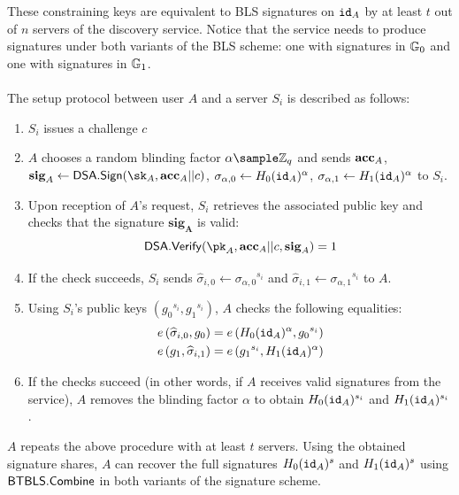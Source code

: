 		\noindent These constraining keys are equivalent to BLS signatures on $\mathtt{id}_A$ by at least $t$ out of $n$ servers of the discovery service. Notice that the service needs to produce signatures under both variants of the BLS scheme: one with signatures in $\mathbb{G}_0$ and one with signatures in $\mathbb{G}_1$.
		
		
		\paragraph{} The setup protocol between user $A$ and a server $S_i$ is described as follows:
		\begin{enumerate}
			\item $S_i$ issues a challenge $c$
			\item $A$ chooses a random blinding factor $\alpha \sample \mathbb{Z}_q$ and sends $\mathbf{acc}_A$, $\mathbf{sig}_A \leftarrow \SIG.\Sign(\sk_A, \acc_A || c)$, $\sigma_{\alpha,0} \leftarrow H_0(\mathtt{id}_A)^\alpha$, $\sigma_{\alpha,1} \leftarrow H_1(\mathtt{id}_A)^\alpha$ to $S_i$.
			\item Upon reception of $A$'s request, $S_i$ retrieves the associated public key and checks that the signature $\mathbf{sig_A}$ is valid:
			\begin{equation}
				\SIG.\Verif(\pk_A, \acc_A||c, \mathbf{sig}_A) = 1
			\end{equation}
		\item If the check succeeds, $S_i$ sends $\widehat\sigma_{i,0} \leftarrow {\sigma_{\alpha,0}}^{s_i}$ and $\widehat\sigma_{i,1} \leftarrow {\sigma_{\alpha,1}}^{s_i}$ to $A$.
		\item Using $S_i$'s public keys $({g_0}^{s_i}, {g_1}^{s_i})$, $A$ checks the following equalities:
		\begin{align}
			\label{eq:usercheck0}
			e\left(\widehat\sigma_{i,0}, g_0 \right) &= e\left(H_0(\mathtt{id}_A)^\alpha, {g_0}^{s_i} \right) \\
			\label{eq:usercheck1}
			e\left(g_1, \widehat\sigma_{i,1} \right) &= e\left({g_1}^{s_i}, H_1(\mathtt{id}_A)^\alpha \right)
		\end{align}
		\item If the checks succeed (in other words, if $A$ receives valid signatures from the service), $A$ removes the blinding factor $\alpha$ to obtain $H_0(\mathtt{id}_A)^{s_i}$ and $H_1(\mathtt{id}_A)^{s_i}$.
		\end{enumerate}
		
	
	\noindent $A$ repeats the above procedure with at least $t$ servers. Using the obtained signature shares, $A$ can recover the full signatures $H_0(\mathtt{id}_A)^s$ and $H_1(\mathtt{id}_A)^s$ using $\mathsf{BTBLS}.\mathsf{Combine}$ in both variants of the signature scheme.
	
